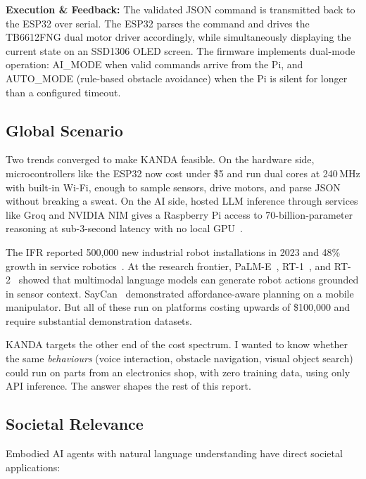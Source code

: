 \textbf{Execution \& Feedback:}
The validated JSON command is transmitted back to the ESP32 over serial. The ESP32 parses the command and drives the TB6612FNG dual motor driver accordingly, while simultaneously displaying the current state on an SSD1306 OLED screen. The firmware implements dual-mode operation: AI\_MODE when valid commands arrive from the Pi, and AUTO\_MODE (rule-based obstacle avoidance) when the Pi is silent for longer than a configured timeout.

\subsection{Global Scenario}
\label{subsec:global}

Two trends converged to make KANDA feasible. On the hardware side, microcontrollers like the ESP32 now cost under \$5 and run dual cores at 240\,MHz with built-in Wi-Fi, enough to sample sensors, drive motors, and parse JSON without breaking a sweat. On the AI side, hosted LLM inference through services like Groq and NVIDIA NIM gives a Raspberry Pi access to 70-billion-parameter reasoning at sub-3-second latency with no local GPU~\cite{shi2016edge,bonomi2012fog}.

The IFR reported 500,000 new industrial robot installations in 2023 and 48\% growth in service robotics~\cite{ifr2024report}. At the research frontier, PaLM-E~\cite{driess2023palme}, RT-1~\cite{brohan2022rt1}, and RT-2~\cite{brohan2023rt2} showed that multimodal language models can generate robot actions grounded in sensor context. SayCan~\cite{ahn2022saycan} demonstrated affordance-aware planning on a mobile manipulator. But all of these run on platforms costing upwards of \$100,000 and require substantial demonstration datasets.

KANDA targets the other end of the cost spectrum. I wanted to know whether the same \textit{behaviours} (voice interaction, obstacle navigation, visual object search) could run on parts from an electronics shop, with zero training data, using only API inference. The answer shapes the rest of this report.

\subsection{Societal Relevance}
\label{subsec:societal}

Embodied AI agents with natural language understanding have direct societal applications:

